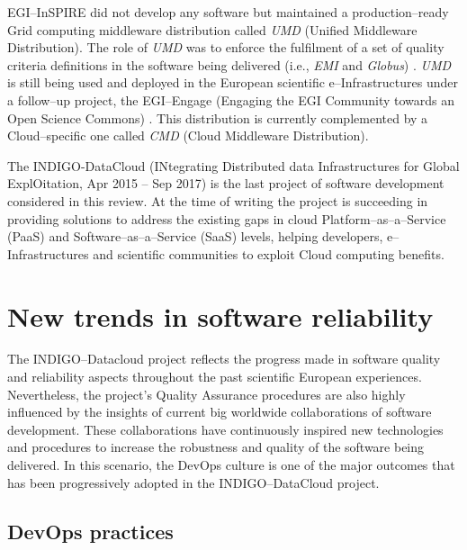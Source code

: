 \documentclass[journal]{IEEEtran}
\begin{document}
EGI--InSPIRE did not
develop any software but maintained a production--ready Grid computing
middleware distribution called {\sl UMD} (Unified Middleware Distribution).
The role of {\sl UMD} was to enforce the fulfilment of a set of quality
criteria definitions \cite{egi-qc} in the software being delivered (i.e.,
{\sl EMI} and {\sl Globus}) \cite{mario}. {\sl UMD} is still being used and
deployed in the European scientific e--Infrastructures under a follow--up
project, the EGI--Engage (Engaging the EGI Community towards an Open Science
Commons) \cite{cordis:egi-engage}. This distribution is currently complemented
by a Cloud--specific one called {\sl CMD} (Cloud Middleware Distribution).

The INDIGO-DataCloud (INtegrating Distributed data Infrastructures for Global
ExplOitation, Apr 2015 -- Sep 2017) \cite{cordis:indigo} is the last
project of software development considered in this review. At the time of writing
the project is succeeding in providing solutions to address the existing gaps in
cloud Platform--as--a--Service (PaaS) and Software--as--a--Service (SaaS) levels,
helping developers, e--Infrastructures and scientific communities to exploit
Cloud computing benefits.

\section{New trends in software reliability}
\label{sec:ntsr}

The INDIGO--Datacloud project reflects the progress made in software
quality and reliability aspects throughout the past scientific European
experiences. Nevertheless, the project’s Quality Assurance procedures are also
highly influenced by the insights of current big worldwide collaborations of
software development. These collaborations have continuously inspired new
technologies and procedures to increase the robustness and quality of the
software being delivered. In this scenario, the DevOps culture is one of the
major outcomes that has been progressively adopted in the INDIGO--DataCloud
project.

\subsection{DevOps practices}
\label{sec:devops}
\end{document}
